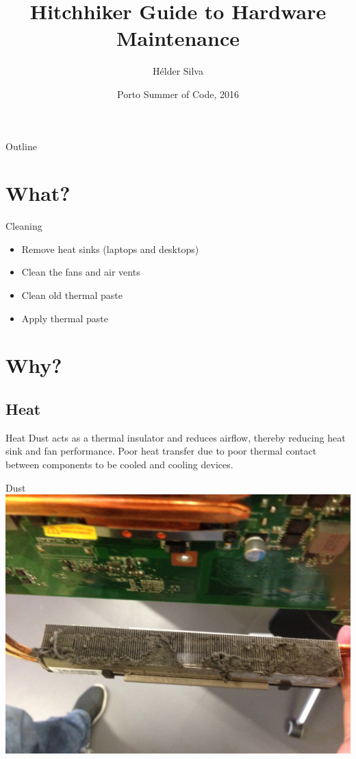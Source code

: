 \documentclass{beamer}
\title{Hitchhiker Guide to Hardware Maintenance}
\author{Hélder Silva}
\date{Porto Summer of Code, 2016}
\begin{document}
\begin{frame}
  \titlepage
\end{frame}

\begin{frame}{Outline}
  \tableofcontents
\end{frame}

\section{What?}

\begin{frame}{Cleaning}
    \begin{itemize}
        \item Remove heat sinks (laptops and desktops)
        \item Clean the fans and air vents
        \item Clean old thermal paste
        \item Apply thermal paste
    \end{itemize}
\end{frame}

\section{Why?}

\subsection{Heat}
\begin{frame}{Heat}
    Dust acts as a thermal insulator and reduces airflow, thereby reducing heat sink and fan performance.
    \newline
    \newline
    Poor heat transfer due to poor thermal contact between components to be cooled and cooling devices.
\end{frame}

\begin{frame}{Dust}
    \centering
    \includegraphics[scale=0.075]{dust}
\end{frame}
\end{document}
